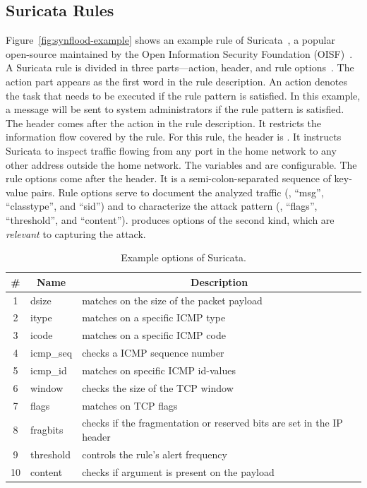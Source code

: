 \documentclass[sigconf,review, anonymous]{acmart}
\begin{document}
\subsection{Suricata Rules}
\label{sec:example-suricata-rules}

Figure~\ref{fig:synflood-example} shows an example rule of
Suricata~\cite{suricata}, a popular open-source \nids{} maintained by
the Open Information Security Foundation (OISF)~\cite{oisf}. A
Suricata rule is divided in three parts---action, header, and rule
options~\cite{suri-rule-format}. The action part appears as the first
word in the rule description. An action denotes the task that needs to
be executed if the rule pattern is satisfied. In this example, a
message will be sent to system administrators if the rule pattern is
satisfied. The header comes after the action in the rule
description. It restricts the information flow covered by the
rule. For this rule, the header is . It instructs Suricata to inspect 
traffic flowing from any port in the home network to any other address
outside the home network. The variables  and
 are configurable. The rule options come after
the header. It is a semi-colon-separated sequence of key-value
pairs. Rule options serve to document the analyzed traffic (\eg{},
``msg'', ``classtype'', and ``sid'') and to characterize the attack
pattern (\eg, ``flags'', ``threshold'', and ``content''). \tname{}
produces options of the second kind, which are \emph{relevant} to
capturing the attack.

\begin{table}[t!]
  \caption{\label{table:rules}Example options of Suricata.}  
  \centering
  \begin{tabular}{clp{5.5cm}}
    \toprule
    \multicolumn{1}{c}{\#} & \multicolumn{1}{c}{Name} &  \multicolumn{1}{c}{Description}\\
    \midrule     
    1 & dsize & matches on the size of the packet payload\\
    2 & itype &  matches on a specific ICMP type\\
    3 & icode & matches on a specific ICMP code\\
    4 & icmp\_seq  & checks a ICMP sequence number\\
    5 & icmp\_id & matches on specific ICMP id-values\\
    6 & window & checks the size of the TCP window\\
    7 & flags & matches on TCP flags\\
    8 & fragbits & checks if the fragmentation or reserved bits are set in the IP header\\
    9 & threshold & controls the rule’s alert frequency\\
    10 & content & checks if argument is present on the payload\\
    \bottomrule
  \end{tabular}
\end{table}
\end{document}
